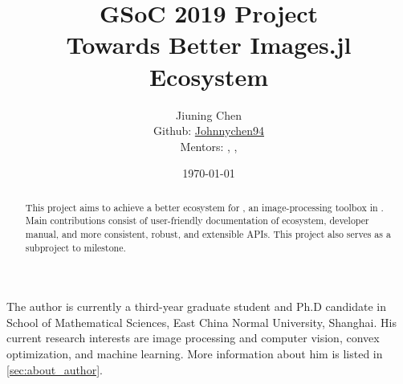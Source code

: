 \documentclass[12pt, a4paper]{article}
\title{GSoC 2019 Project\\Towards Better Images.jl Ecosystem}
\author{Jiuning Chen\mailto{johnnychen94@hotmail.com}\\
Github: \href{https://github.com/johnnychen94}{Johnnychen94}\\
Mentors: \zygmunt, \julio, \timholy
}
\date{\today}
\begin{document}
\maketitle

\renewcommand\abstractname{Abstract}
\begin{abstract}
    This project aims to achieve a better ecosystem for \href{https://juliaimages.org/latest/}{\images}, an image-processing toolbox in \href{https://julialang.org/}{\langjulia}. Main contributions consist of user-friendly documentation of \images{} ecosystem, developer manual, and more consistent, robust, and extensible APIs. This project also serves as a subproject to \images{}  milestone.
\end{abstract}

\noindent The author is currently a third-year graduate student and Ph.D candidate in School of Mathematical Sciences, East China Normal University, Shanghai. His current research interests are image processing and computer vision, convex optimization, and machine learning. More information about him is listed in \cref{sec:about_author}.\par






\end{document}
